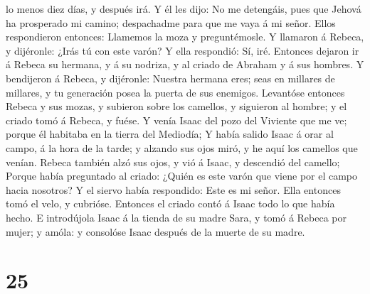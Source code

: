 lo menos diez días, y después irá.  Y él les dijo: No me
detengáis, pues que Jehová ha prosperado mi camino; despachadme para que
me vaya á mi señor.  Ellos respondieron entonces: Llamemos
la moza y preguntémosle.  Y llamaron á Rebeca, y dijéronle:
¿Irás tú con este varón? Y ella respondió: Sí, iré. 
Entonces dejaron ir á Rebeca su hermana, y á su nodriza, y al criado de
Abraham y á sus hombres.  Y bendijeron á Rebeca, y
dijéronle: Nuestra hermana eres; seas en millares de millares, y tu
generación posea la puerta de sus enemigos.  Levantóse
entonces Rebeca y sus mozas, y subieron sobre los camellos, y siguieron
al hombre; y el criado tomó á Rebeca, y fuése.  Y venía
Isaac del pozo del Viviente que me ve; porque él habitaba en la tierra
del Mediodía;  Y había salido Isaac á orar al campo, á la
hora de la tarde; y alzando sus ojos miró, y he aquí los camellos que
venían.  Rebeca también alzó sus ojos, y vió á Isaac, y
descendió del camello;  Porque había preguntado al criado:
¿Quién es este varón que viene por el campo hacia nosotros? Y el siervo
había respondido: Este es mi señor. Ella entonces tomó el velo, y
cubrióse.  Entonces el criado contó á Isaac todo lo que
había hecho.  E introdújola Isaac á la tienda de su madre
Sara, y tomó á Rebeca por mujer; y amóla: y consolóse Isaac después de
la muerte de su madre.

\hypertarget{section-24}{%
\section{25}\label{section-24}}

